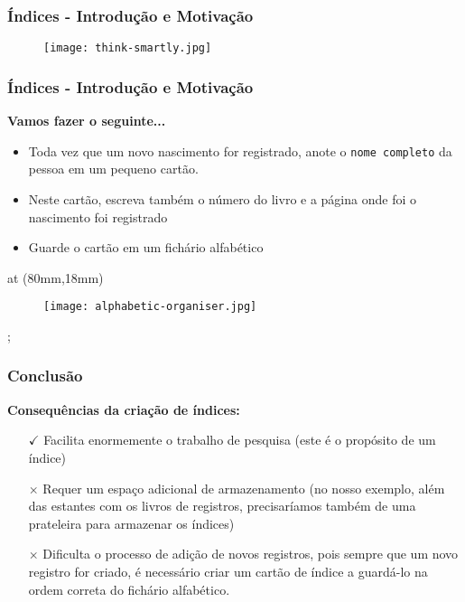 \documentclass[t, 10pt, aspectratio=169, table, x11names]{beamer}
\begin{document}
	\begin{frame}
		\frametitle{Índices - Introdução e Motivação}
		\bigskip
		\begin{figure}[h]
			\centering
			\texttt{[image: think-smartly.jpg]}
		\end{figure}
	\end{frame}

	\begin{frame}
		\frametitle{Índices - Introdução e Motivação}
		\textbf{Vamos fazer o seguinte...}
		\bigskip
		\begin{itemize}
			\item Toda vez que um novo nascimento for registrado, anote o \texttt{nome completo} da pessoa em um pequeno cartão.
			\bigskip
			\item Neste cartão, escreva também o número do livro e a página onde foi o nascimento foi registrado
			\bigskip
			\item Guarde o cartão em um fichário alfabético
		\end{itemize}

		\tikzoverlay[text width=30mm] at (80mm,18mm) {
			\begin{figure}[h]
				\centering
				\texttt{[image: alphabetic-organiser.jpg]}
			\end{figure}
		};

	\end{frame}


	\begin{frame}
		\frametitle{Conclusão}
		\textbf{Consequências da criação de índices:}
		\bigskip
		\begin{itemize}
			\item[\textbf{$\checkmark$}] Facilita enormemente o trabalho de pesquisa (este é o propósito de um índice)
			\bigskip
			\item[\textbf{$\times$}] Requer um espaço adicional de armazenamento (no nosso exemplo, além das estantes com os livros de registros, precisaríamos também de uma prateleira para armazenar os índices)
			\bigskip
			\item[$\times$] Dificulta o processo de adição de novos registros, pois sempre que um novo registro for criado, é necessário criar um cartão de índice a guardá-lo na ordem correta do fichário alfabético.
		\end{itemize}
	\end{frame}
\end{document}
